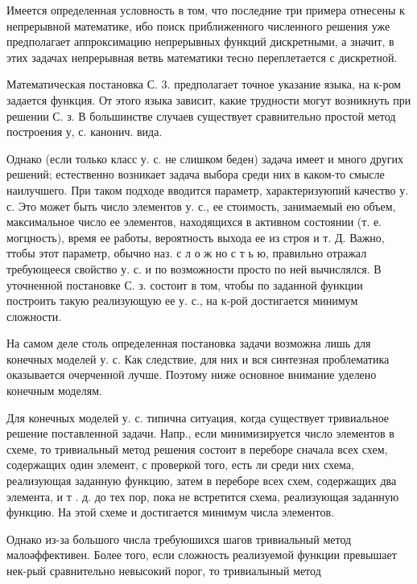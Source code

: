 \documentclass[10pt]{article}
\begin{document}
Имеется определенная условность в том, что последние три примера отнесены к непрерывной математике, ибо поиск приближенного численного решения уже предполагает аппроксимацию непрерывных функций дискретными, а значит, в этих задачах непрерывная ветвь математики тесно переплетается с дискретной.



Математическая постановка С. 3. предполагает точное указание языка, на к-ром задается функция. От этого языка зависит, какие трудности могут возникнуть при решении С. з. В большинстве случаев существует сравнительно простой метод построения у, с. канонич. вида.



Однако (если только класс у. с. не слишком беден) задача имеет и много других решений; естественно возникает задача выбора среди них в каком-то смысле наилучшего. При таком подходе вводится параметр, характеризуюпий качество у. с. Это может быть число элементов у. с., ее стоимость, занимаемый ею объем, максимальное число ее элементов, находящихся в активном состоянии (т. е. могцность), время ее работы, вероятность выхода ее из строя и т. Д. Важно, ттобы этот параметр, обычно наз. с л о ж но с т ь ю, правильно отражал требующееся свойство у. с. и по возможности просто по ней вычислялся. В уточненной постановке С. з. состоит в том, чтобы по заданной функции построить такую реализующую ее у. с., на к-рой достигается минимум сложности.



На самом деле столь определенная постановка задачи возможна лишь для конечных моделей у. с. Как следствие, для них и вся синтезная проблематика оказывается очерченной лучше. Поэтому ниже основное внимание уделено конечным моделям.



Для конечных моделей у. с. типична ситуация, когда существует тривиальное решение поставленной задачи. Напр., если минимизируется число элементов в схеме, то тривиальный метод решения состоит в переборе сначала всех схем, содержащих один элемент, с проверкой того, есть ли среди них схема, реализующая заданную функцию, затем в переборе всех схем, содержащих два элемента, и т . д. до тех пор, пока не встретится схема, реализующая заданную функцию. На этой схеме и достигается минимум числа элементов.



Однако из-за большого числа требуюшихся шагов тривиальный метод малоәффективен. Более того, если сложность реализуемой функции превышает нек-рый сравнительно невысокий порог, то тривиалыный метод
\end{document}
